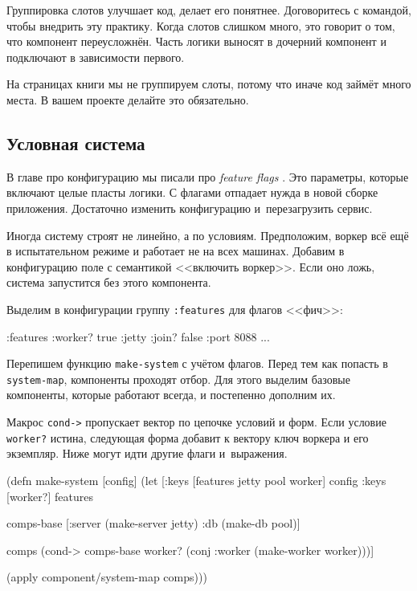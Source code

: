 Группировка слотов улучшает код, делает его понятнее. Договоритесь с командой,
чтобы внедрить эту практику. Когда слотов слишком много, это говорит о том, что
компонент переусложнён. Часть логики выносят в дочерний компонент и подключают в
зависимости первого.

На страницах книги мы не группируем слоты, потому что иначе код займёт много
места. В вашем проекте делайте это обязательно.

\subsection{Условная система}


В главе про конфигурацию мы писали про \emph{feature flags} .
Это параметры, которые включают целые пласты логики. С флагами отпадает нужда в новой сборке
приложения. Достаточно изменить конфигурацию и~перезагрузить сервис.

Иногда систему строят не линейно, а по условиям. Предположим, воркер всё ещё в
испытательном режиме и работает не на всех машинах. Добавим в конфигурацию поле
с семантикой <<включить воркер>>. Если оно ложь, система запустится без этого
компонента.


Выделим в конфигурации группу \verb|:features| для флагов <<фич>>:

\begin{english}
  \begin{clojure}
{:features {:worker? true}
 :jetty {:join? false :port 8088}
 ...}
  \end{clojure}
\end{english}

Перепишем функцию \verb|make-system| с учётом флагов. Перед тем как попасть в
\verb|system-map|, компоненты проходят отбор. Для этого выделим базовые
компоненты, которые работают всегда, и постепенно дополним их.

Макрос \verb|cond->| пропускает вектор по цепочке условий и форм. Если условие
\verb|worker?| истина, следующая форма добавит к вектору ключ воркера и его
экземпляр. Ниже могут идти другие флаги и~выражения.

\ifx\DEVICETYPE\MOBILE

\begin{english}
  \begin{clojure}
(defn make-system [config]
  (let [{:keys [features
                jetty
                pool
                worker]} config
        {:keys [worker?]} features

        comps-base
        [:server (make-server jetty)
         :db     (make-db pool)]

        comps (cond-> comps-base
                worker?
                (conj :worker
                  (make-worker worker)))]

    (apply component/system-map comps)))
  \end{clojure}
\end{english}

